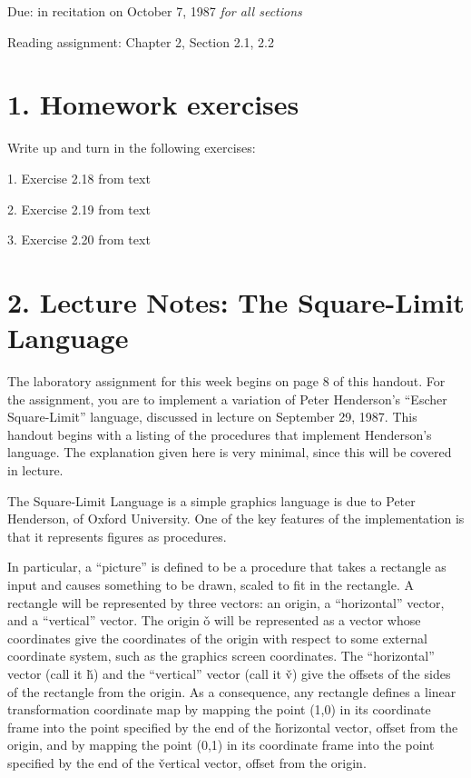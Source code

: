 \vpar
Due: in recitation on October 7, 1987 {\it for all sections}


\vpar
Reading assignment:  Chapter 2, Section 2.1, 2.2

\chapter{1. Homework exercises}

Write up and turn in the following exercises:

1. Exercise 2.18 from text

2. Exercise 2.19 from text

3. Exercise 2.20 from text

\chapter{ 2. Lecture Notes:  The Square-Limit Language}

The laboratory assignment for this week begins on page
8 of this handout.  For the assignment,
you are to implement a variation of Peter Henderson's ``Escher
Square-Limit'' language, discussed in lecture on
September 29, 1987.  This handout begins with a listing of the
procedures that implement Henderson's language.  The explanation given
here is very minimal, since this will be covered in lecture.


The Square-Limit Language is a simple graphics language is due to Peter
Henderson, of Oxford University.  One of the key features of 
the implementation is that it represents figures as procedures.

In particular, a ``picture'' is defined to be a procedure that takes a
rectangle as
input and causes something to be drawn, scaled to fit in the
rectangle.  A rectangle will be represented by three vectors: an
origin, a ``horizontal'' vector, and a ``vertical'' vector.   The origin \v{o}
will be represented as a vector whose coordinates give the coordinates
of the origin with respect to some external coordinate system, such as
the graphics screen coordinates.  The ``horizontal'' vector (call it
\v{h}) and the ``vertical'' vector (call it \v{v}) give the offsets of
the sides of the rectangle from the origin.  As a consequence, any
rectangle defines a linear transformation coordinate map by
mapping the point (1,0) in its coordinate frame into the point specified
by the end of the \v{horizontal} vector, offset from the origin, and by
mapping the point (0,1) in its coordinate frame into the point specified
by the end of the \v{vertical} vector, offset from the origin.

